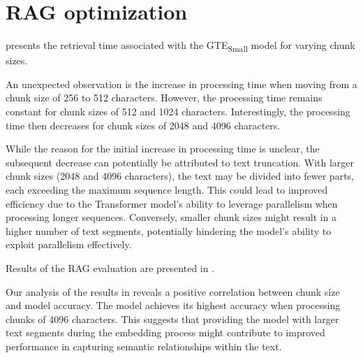 \section{\ac{RAG} optimization}

 presents the retrieval time associated with the \ac{GTE}\textsubscript{Small} model for varying chunk sizes.



An unexpected observation is the increase in processing time when moving from a chunk size of 256 to 512 characters.
However, the processing time remains constant for chunk sizes of 512 and 1024 characters.
Interestingly, the processing time then decreases for chunk sizes of 2048 and 4096 characters.

While the reason for the initial increase in processing time is unclear, the subsequent decrease can potentially be attributed to text truncation.
With larger chunk sizes (2048 and 4096 characters), the text may be divided into fewer parts, each exceeding the maximum sequence length.
This could lead to improved efficiency due to the Transformer model's ability to leverage parallelism when processing longer sequences.
Conversely, smaller chunk sizes might result in a higher number of text segments, potentially hindering the model's ability to exploit parallelism effectively.


Results of the \ac{RAG} evaluation are presented in .


Our analysis of the results in  reveals a positive correlation between chunk size and model accuracy.
The model achieves its highest accuracy when processing chunks of 4096 characters.
This suggests that providing the model with larger text segments during the embedding process might contribute to improved performance in capturing semantic relationships within the text.



